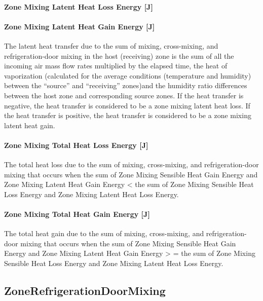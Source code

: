 \paragraph{Zone Mixing Latent Heat Loss Energy {[}J{]}}\label{zone-mixing-latent-heat-loss-energy-j-1}

\paragraph{Zone Mixing Latent Heat Gain Energy {[}J{]}}\label{zone-mixing-latent-heat-gain-energy-j-1}

The latent heat transfer due to the sum of mixing, cross-mixing, and refrigeration-door mixing in the host (receiving) zone is the sum of all the incoming air mass flow rates multiplied by the elapsed time, the heat of vaporization (calculated for the average conditions (temperature and humidity) between the ``source'' and ``receiving'' zones)and the humidity ratio differences between the host zone and corresponding source zones. If the heat transfer is negative, the heat transfer is considered to be a zone mixing latent heat loss. If the heat transfer is positive, the heat transfer is considered to be a zone mixing latent heat gain.

\paragraph{Zone Mixing Total Heat Loss Energy {[}J{]}}\label{zone-mixing-total-heat-loss-energy-j-1}

The total heat loss due to the sum of mixing, cross-mixing, and refrigeration-door mixing that occurs when the sum of Zone Mixing Sensible Heat Gain Energy and Zone Mixing Latent Heat Gain Energy \textless{} the sum of Zone Mixing Sensible Heat Loss Energy and Zone Mixing Latent Heat Loss Energy.

\paragraph{Zone Mixing Total Heat Gain Energy {[}J{]}}\label{zone-mixing-total-heat-gain-energy-j-1}

The total heat gain due to the sum of mixing, cross-mixing, and refrigeration-door mixing that occurs when the sum of Zone Mixing Sensible Heat Gain Energy and Zone Mixing Latent Heat Gain Energy \textgreater{} = the sum of Zone Mixing Sensible Heat Loss Energy and Zone Mixing Latent Heat Loss Energy.

\subsection{ZoneRefrigerationDoorMixing}\label{zonerefrigerationdoormixing}

